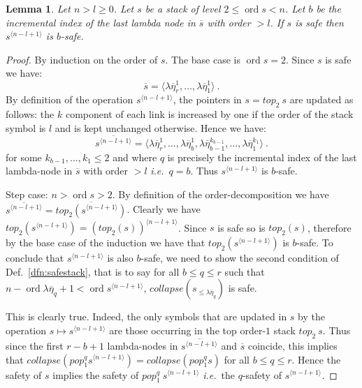 \documentclass{article}
\newcommand{\ord}{\mathop{\mathrm{ord}}}
\newcommand{\prefixof}{\leqslant}
\newtheorem{lemma}{Lemma}[section]
\theoremstyle{remark}
\theoremstyle{definition}
\newcommand\orddec\overline
\def\ie{{\it i.e.}\ }
\begin{document}
\begin{lemma}
\label{lem:incrk_qsafe}
Let $n>l\geq 0$. Let $s$ be a stack of level $2\leq \ord{s} <n$.
 Let $b$ be the incremental index of the last lambda node in $\orddec{s}$
 with order $>l$.
If $s$ is safe then $s^{\langle n-l+1 \rangle}$ is $b$-safe.
\end{lemma}
\begin{proof}
  By induction on the order of $s$.
The base case is $\ord{s} = 2$.
Since $s$ is safe we have:
\begin{equation}
 \orddec{s} = \langle \lambda \overline{\eta}_r^1
, \ldots, \lambda \overline{\eta}_1^1   \rangle \ . \label{eqn:orddec_s}
\end{equation}
By definition of the operation $s^{\langle n-l+1 \rangle}$, the pointers in $s = top_2\ s$ are updated as follows:
the $k$ component of each link is increased by one if the order of
the stack symbol is $l$ and is kept unchanged otherwise.
Hence we have:
\begin{equation}
\orddec{s^{\langle n-l+1 \rangle}} = \langle
\lambda \overline{\eta}_r^1, \ldots,  \lambda \overline{\eta}_{b}^1, \lambda \overline{\eta}_{b-1}^{k_{b-1}}, \ldots,
 \lambda \overline{\eta}_1^{k_1} \rangle
\ .
\end{equation}
for some $k_{b-1}, \ldots , k_1 \leq 2$ and where $q$ is precisely the incremental index of the last lambda-node in $\orddec{s}$ with order $>l$ \ie $q=b$. Thus $s^{\langle n-l+1 \rangle}$ is $b$-safe.

Step case: $n>\ord{s}>2$.
By definition of the order-decomposition we have
$\orddec{s^{\langle n-l+1 \rangle}} = \orddec{top_2 (s^{\langle n-l+1 \rangle})}$.
Clearly we have $top_2 (s^{\langle n-l+1 \rangle}) = (top_2 (s))^{\langle n-l+1 \rangle}$.
Since $s$ is safe so is $top_2(s)$, therefore by the base case of the induction we have that $top_2 (s^{\langle n-l+1 \rangle})$ is $b$-safe. To conclude that $s^{\langle n-l+1 \rangle}$ is also $b$-safe, we need to show the second condition of Def.~\ref{dfn:safestack},
that is to say for all $b\leq q \leq r$ such that
$n-\ord{\lambda \overline{\eta}_{q}} +1 < \ord{s^{\langle n-l+1 \rangle}}$, $collapse(s_{\prefixof \lambda \overline{\eta}_{q}})$ is safe.

This is clearly true. Indeed, the only symbols that are updated in $s$ by the operation $s \mapsto s^{\langle n-l+1 \rangle}$ are those occurring in the top order-$1$ stack $top_2~s$. Thus since the first $r-b+1$ lambda-nodes in $\orddec{s^{\langle n-l+1 \rangle}}$ and $\orddec{s}$ coincide, this implies that $collapse(pop_1^{q} s^{\langle n-l+1 \rangle}) = collapse(pop_1^q s)$ for all $b \leq q \leq r$.
Hence the safety of $s$ implies the safety of $pop_1^{q}~s^{\langle n-l+1 \rangle}$ \ie the $q$-safety of $s^{\langle n-l+1 \rangle}$.
\end{proof}
\end{document}
